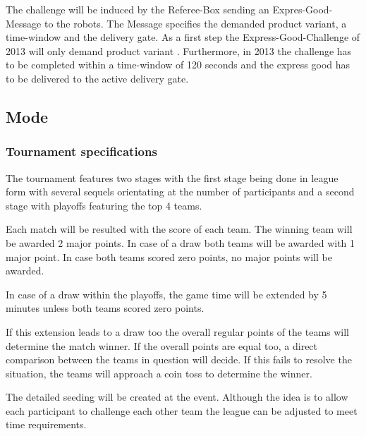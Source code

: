 \documentclass[12pt,twoside]{article}
\newenvironment{rulechange}{}{}
\begin{document}
\begin{rulechange}
The challenge will be induced by the Referee-Box sending an Expres-Good-Message
to the robots. The Message specifies the demanded product variant, a time-window
and the delivery gate. As a first step the Express-Good-Challenge of 2013 will
only demand product variant . Furthermore, in 2013 the challenge has to be
completed within a time-window of 120 seconds and the express good has to be
delivered to the active delivery gate.
\end{rulechange}

\subsection{Mode}
\subsubsection{Tournament specifications}

The tournament features two stages with the first stage being done in
league form with several sequels orientating at the number of
participants and a second stage with playoffs featuring the top 4
teams.

Each match will be resulted with the score of each team. The winning
team will be awarded 2 major points. In case of a draw both teams will
be awarded with 1 major point. In case both teams scored zero points,
no major points will be awarded.

In case of a draw within the playoffs, the game time will be extended
by 5 minutes unless both teams scored zero points.

If this extension leads to a draw too the overall regular points of
the teams will determine the match winner. If the overall points are
equal too, a direct comparison between the teams in question will
decide. If this fails to resolve the situation, the teams will
approach a coin toss to determine the winner.

The detailed seeding will be created at the event. Although the idea
is to allow each participant to challenge each other team the league
can be adjusted to meet time requirements.
\end{document}

